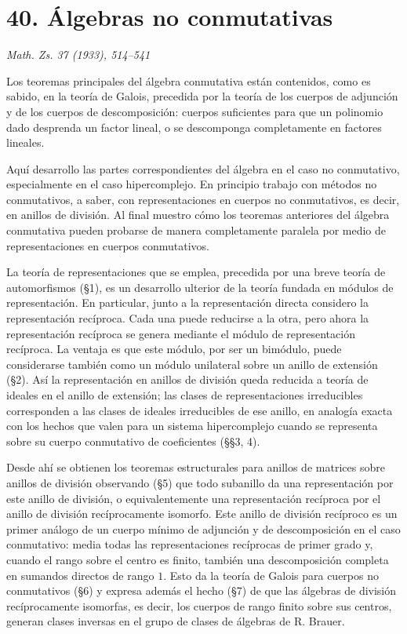 \clearpage
\section*{40. Álgebras no conmutativas}

\begin{center}
\emph{Math. Zs. 37 (1933), 514--541}
\end{center}

Los teoremas principales del álgebra conmutativa están contenidos, como es sabido, en la teoría de Galois, precedida por la teoría de los cuerpos de adjunción y de los cuerpos de descomposición: cuerpos suficientes para que un polinomio dado desprenda un factor lineal, o se descomponga completamente en factores lineales.

Aquí desarrollo las partes correspondientes del álgebra en el caso no conmutativo, especialmente en el caso hipercomplejo. En principio trabajo con métodos no conmutativos, a saber, con representaciones en cuerpos no conmutativos, es decir, en anillos de división. Al final muestro cómo los teoremas anteriores del álgebra conmutativa pueden probarse de manera completamente paralela por medio de representaciones en cuerpos conmutativos.

La teoría de representaciones que se emplea, precedida por una breve teoría de automorfismos (§1), es un desarrollo ulterior de la teoría fundada en módulos de representación. En particular, junto a la representación directa considero la representación recíproca. Cada una puede reducirse a la otra, pero ahora la representación recíproca se genera mediante el módulo de representación recíproca. La ventaja es que este módulo, por ser un bimódulo, puede considerarse también como un módulo unilateral sobre un anillo de extensión (§2). Así la representación en anillos de división queda reducida a teoría de ideales en el anillo de extensión; las clases de representaciones irreducibles corresponden a las clases de ideales irreducibles de ese anillo, en analogía exacta con los hechos que valen para un sistema hipercomplejo cuando se representa sobre su cuerpo conmutativo de coeficientes (§§3, 4).

Desde ahí se obtienen los teoremas estructurales para anillos de matrices sobre anillos de división observando (§5) que todo subanillo da una representación por este anillo de división, o equivalentemente una representación recíproca por el anillo de división recíprocamente isomorfo. Este anillo de división recíproco es un primer análogo de un cuerpo mínimo de adjunción y de descomposición en el caso conmutativo: media todas las representaciones recíprocas de primer grado y, cuando el rango sobre el centro es finito, también una descomposición completa en sumandos directos de rango \(1\). Esto da la teoría de Galois para cuerpos no conmutativos (§6) y expresa además el hecho (§7) de que las álgebras de división recíprocamente isomorfas, es decir, los cuerpos de rango finito sobre sus centros, generan clases inversas en el grupo de clases de álgebras de R. Brauer.

